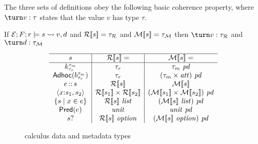 The three
sets of definitions obey the following basic coherence property, where
$\turn v : \tau$ states that the value $v$ has type $\tau$.

\begin{proposition}
  If $\mathcal{E};F;r \models s \rightsquigarrow v,d$ and ${\cal R}[\![ s ]\!] =
  \tau_{\mathcal{R}}$ and ${\cal M}[\![ s ]\!] = \tau_{\mathcal{M}}$ then $\turn
  v : \tau_{\mathcal{R}}$ and $\turn d : \tau_{\mathcal{M}}$
\end{proposition}


\begin{figure}

\[
\begin{array}{c|c|c}
\hline
s & \repty{s} = & \mdty{s} =  \\
\hline
\Sk & \tau_r &  \tau_m~\mathit{pd} \\
\SAdhoc{b} & \tau_r & (\tau_m \times \meta)~\mathit{pd} \\
\SPath{e}{s} & \repty{s} & \mdty{s} \\
\SPair{x}{s_1}{s_2} & \repty{s_1} \times \repty{s_2} & \pd{\mdty{s_1} \times \mdty{s_2}} \\
\SSetComp{s}{x}{e} & \repty{s}~\typ{list} & \pd{\mdty{s}~\typ{list}}    \\
\SPred{e} & \typ{unit} & \typ{unit}~\mathit{pd}\\
\SOption{s} & \repty{s}~\typ{option} & \pd{\mdty{s}~\typ{option}} %
\end{array}
\]

%
\caption{\forest{} calculus data and metadata types}
\label{fig:calculus-types}
\end{figure}




